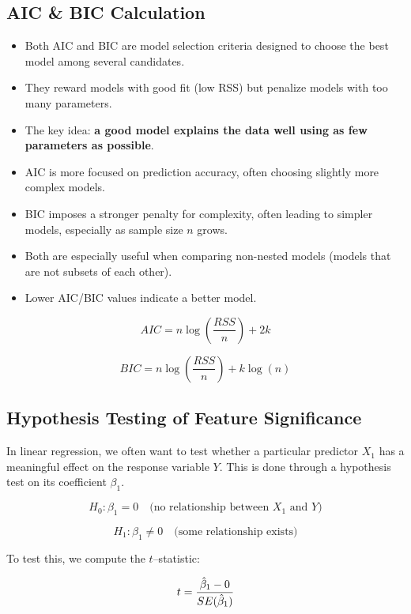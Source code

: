 \documentclass[11pt,a4paper]{article}
\begin{document}
\subsection{AIC & BIC Calculation}

\begin{itemize}
    \item Both AIC and BIC are model selection criteria designed to choose the best model among several candidates.
    \item They reward models with good fit (low RSS) but penalize models with too many parameters.
    \item The key idea: \textbf{a good model explains the data well using as few parameters as possible}.
    \item AIC is more focused on prediction accuracy, often choosing slightly more complex models.
    \item BIC imposes a stronger penalty for complexity, often leading to simpler models, especially as sample size $n$ grows.
    \item Both are especially useful when comparing non-nested models (models that are not subsets of each other).
    \item Lower AIC/BIC values indicate a better model.
\end{itemize}

\[
AIC = n \log\left(\frac{RSS}{n}\right) + 2k
\]

\[
BIC = n \log\left(\frac{RSS}{n}\right) + k\log(n)
\]


\subsection{Hypothesis Testing of Feature Significance}

In linear regression, we often want to test whether a particular predictor $X_1$ has a meaningful effect on the response variable $Y$.  
This is done through a hypothesis test on its coefficient $\beta_1$.

\[
H_0 : \beta_1 = 0 \quad \text{(no relationship between $X_1$ and $Y$)}
\]

\[
H_1 : \beta_1 \ne 0 \quad \text{(some relationship exists)}
\]

To test this, we compute the $t$–statistic:

\[
\Large 
t = \frac{\hat{\beta}_1 - 0}{SE(\hat{\beta}_1)}
\]
\end{document}
